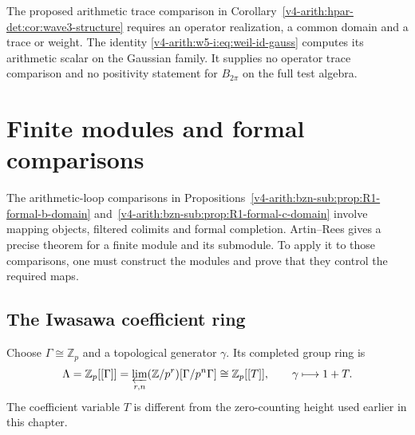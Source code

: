 \begin{remark}
\label{v4-arith:w5-i:rem:H-closure}
The proposed arithmetic trace comparison in
Corollary~\ref{v4-arith:hpar-det:cor:wave3-structure} requires an operator realization,
a common domain and a trace or weight.
The identity \eqref{v4-arith:w5-i:eq:weil-id-gauss} computes its
arithmetic scalar on the Gaussian family.
It supplies no operator trace comparison and no positivity statement
for $B_{2\pi}$ on the full test algebra.
\end{remark}

\section{Finite modules and formal comparisons}
\label{v4-arith:w5-i:formal-noetherian}

The arithmetic-loop comparisons in
Propositions~\ref{v4-arith:bzn-sub:prop:R1-formal-b-domain}
and~\ref{v4-arith:bzn-sub:prop:R1-formal-c-domain}
involve mapping objects, filtered colimits and formal completion.
Artin--Rees gives a precise theorem for a finite module and its
submodule. To apply it to those comparisons, one must construct the
modules and prove that they control the required maps.

\subsection{The Iwasawa coefficient ring}
\label{v4-arith:w5-i:iwasawa}

\begin{definition}
\label{v4-arith:w5-i:def:iwasawa}
Choose \(\Gamma\cong\mathbb Z_p\) and a topological generator
\(\gamma\). Its completed group ring is
\[
 \Lambda=\mathbb Z_p[[\Gamma]]
  =\varprojlim_{r,n}(\mathbb Z/p^r)[\Gamma/p^n\Gamma]
  \cong\mathbb Z_p[[T]],\qquad \gamma\longmapsto1+T.
\]
The coefficient variable \(T\) is different from the zero-counting
height used earlier in this chapter.
\end{definition}

